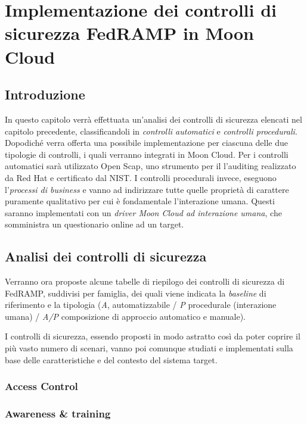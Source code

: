 \documentclass[../main.tex]{subfiles}
\begin{document}
\chapter{Implementazione dei controlli di sicurezza FedRAMP in Moon Cloud}
\section{Introduzione}
In questo capitolo verrà effettuata un'analisi dei controlli di sicurezza elencati nel capitolo precedente, classificandoli in \textit{controlli automatici} e \textit{controlli procedurali}. Dopodiché verra offerta una possibile implementazione per ciascuna delle due tipologie di controlli, i quali verranno integrati in Moon Cloud. Per i controlli automatici sarà utilizzato Open Scap, uno strumento per il l'auditing realizzato da Red Hat e certificato dal NIST. I controlli procedurali invece, eseguono l'\textit{processi di business} e vanno ad indirizzare tutte quelle proprietà di carattere puramente qualitativo per cui è fondamentale l'interazione umana.
Questi saranno implementati con un \textit{driver Moon Cloud ad interazione umana}, che somministra un questionario online ad un target.

\section{Analisi dei controlli di sicurezza}
Verranno ora proposte alcune tabelle di riepilogo dei controlli di sicurezza di FedRAMP, suddivisi per famiglia, dei quali viene indicata la \textit{baseline} di riferimento e la tipologia (\textit{A}, automatizzabile / \textit{P} procedurale (interazione umana) / \textit{A/P} composizione di approccio automatico e manuale).

I controlli di sicurezza, essendo proposti in modo astratto così da poter coprire il più vasto numero di scenari, vanno poi comunque studiati e implementati sulla base delle caratteristiche e del contesto del sistema target.
\subsection{Access Control}


\subsection{Awareness \& training}

\end{document}
